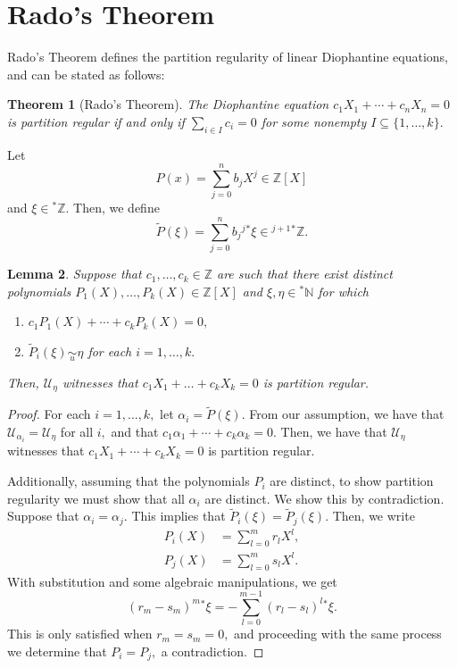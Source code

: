 \documentclass[12pt]{amsart}
\newcommand{\stt}{{}^*}
\newcommand{\NN}{\mathbb{N}}
\newcommand{\ZZ}{\mathbb{Z}}
\newcommand{\mcU}{\mathcal{U}}
\theoremstyle{plain}
\newtheorem{thm}{Theorem}
\newtheorem{lemma}[thm]{Lemma}
\theoremstyle{definition}
\theoremstyle{remark}
\theoremstyle{theorem}
\numberwithin{equation}{section}
\numberwithin{thm}{section}
\begin{document}
\section{Rado's Theorem} 
Rado's Theorem defines the partition regularity of linear Diophantine equations, and can be stated as follows:
\begin{thm}[Rado's Theorem] \label{rado}
The Diophantine equation $c_1X_1 + \cdots + c_nX_n =0$ is partition regular if and only if $\sum_{i \in I}c_i = 0$ for some nonempty $I \subseteq \{1, \ldots , k\}.$
\end{thm}
Let \[P(x) = \sum_{j=0}^n b_j X^j \in \ZZ[X]\] and $\xi \in \stt \ZZ.$ Then, we define \[\tilde{P}(\xi) = \sum_{j=0}^n b_j {}^j \stt \xi \in {}^{j+1}\stt \ZZ.\]
\begin{lemma} \label{105}
Suppose that $c_1, \ldots , c_k \in \ZZ$ are such that there exist distinct polynomials $P_1(X), \ldots , P_k(X) \in \ZZ[X]$ and $\xi, \eta \in \stt \NN$ for which
\begin{enumerate}
    \item $c_1P_1(X) + \cdots + c_kP_k(X) = 0,$
    \item $\tilde{P}_i(\xi) \underset{u}{\sim} \eta$ for each $i = 1, \ldots , k.$
\end{enumerate}
Then, $\mcU_\eta$ witnesses that $c_1X_1 + \ldots + c_kX_k = 0$ is partition regular.
\end{lemma}
\begin{proof}
For each $i = 1, \ldots , k,$ let $\alpha_i = \tilde{P}(\xi).$ From our assumption, we have that $\mcU_{\alpha_i} = \mcU_\eta$ for all $i,$ and that $c_1 \alpha_1 + \cdots + c_k \alpha_k = 0.$ Then, we have that $\mcU_\eta$ witnesses that $c_1X_1 + \cdots + c_kX_k=0$ is partition regular. 

Additionally, assuming that the polynomials $P_i$ are distinct, to show partition regularity we must show that all $\alpha_i$ are distinct. We show this by contradiction. Suppose that $\alpha_i = \alpha_j.$ This implies that $\tilde{P}_i(\xi) = \tilde{P}_j(\xi).$ Then, we write
\begin{align*}
    P_i(X) &= \sum_{l=0}^m r_lX^l, \\
    P_j(X) &= \sum_{l=0}^m s_lX^l.
\end{align*}
With substitution and some algebraic manipulations, we get 
\[(r_m - s_m)^m\stt \xi = - \sum_{l=0}^{m-1} (r_l-s_l)^l \stt \xi. \] This is only satisfied when $r_m = s_m = 0,$ and proceeding with the same process we determine that $P_i = P_j,$ a contradiction.
\end{proof}
\end{document}
